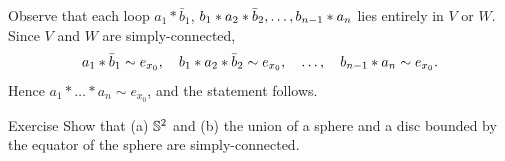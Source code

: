Observe that each loop $a_1*\bar b_1$, $b_1*a_2*\bar b_2, \z\ldots, b_{n-1}*a_n$ lies entirely in $V$ or $W$.
Since $V$ and $W$ are simply-connected,
\[a_1*\bar b_1\sim e_{x_0},\quad
 b_1*a_2*\bar b_2\sim e_{x_0},\quad \ldots\/,\quad b_{n-1}*a_n\sim e_{x_0}.
\]
Hence $a_1*\ldots*a_n\sim e_{x_0}$, and the statement follows.
\qeds

\begin{thm}{Exercise}\label{ex:van-kamp}
Show that (a) $\mathbb{S}^2$ and (b) the union of a sphere and a disc bounded by the equator of the sphere
are simply-connected.

\end{thm}
